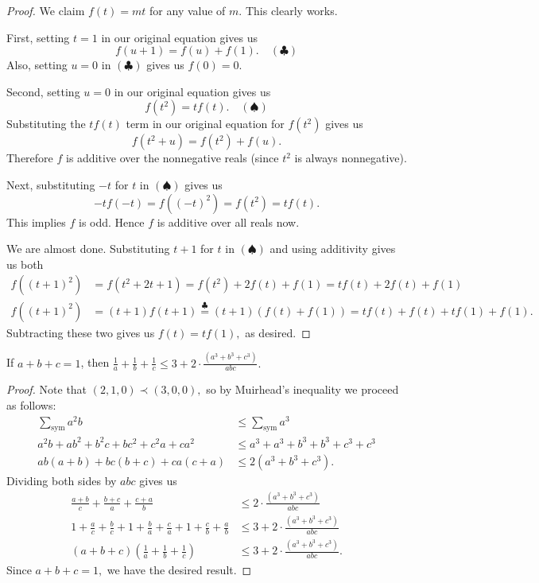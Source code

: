\documentclass[letterpaper,oneside]{scrartcl}
\begin{document}
\begin{proof}
  We claim \(f(t)=mt\) for any value of \(m\). This clearly works. 

  First, setting \(t=1\) in our original equation gives us 
  \[f(u+1) = f(u) + f(1). \quad (\clubsuit)\]
  Also, setting \(u=0\) in \((\clubsuit)\) gives us \(f(0)=0.\)

  Second, setting \(u=0\) in our original equation gives us 
  \[f(t^2) = tf(t). \quad (\spadesuit)\]
  Substituting the \(tf(t)\) term in our original equation for \(f(t^2)\) gives us 
  \[f(t^2+u) = f(t^2) + f(u).\]
  Therefore \(f\) is additive over the nonnegative reals (since \(t^2\) is always nonnegative). 
  
  Next, substituting \(-t\) for \(t\) in \((\spadesuit)\) gives us 
  \[-tf(-t) = f((-t)^2) = f(t^2) = tf(t).\]
  This implies \(f\) is odd. Hence \(f\) is additive over all reals now.

  We are almost done. Substituting \(t+1\) for \(t\) in \((\spadesuit)\) and using additivity gives us both 
  \begin{align*}
    f((t+1)^2) &= f(t^2+2t+1) = f(t^2) + 2f(t) + f(1) = tf(t) + 2f(t) + f(1)\\
    f((t+1)^2) &= (t+1)f(t+1) \overset{\clubsuit}{=} (t+1)(f(t)+f(1)) = tf(t) + f(t) + tf(1) + f(1).
  \end{align*}
  Subtracting these two gives us \(f(t) = tf(1),\) as desired.
\end{proof}
\newpage
\begin{problem*}
  If \(a+b+c=1\), then \(\frac1a + \frac1b + \frac1c \leq 3 + 2\cdot\frac{\left(a^3+b^3+c^3\right)}{abc}.\)
\end{problem*}
\begin{proof}
  Note that \((2,1,0) \prec (3,0,0),\) so by Muirhead's inequality we proceed as follows:
  \begin{align*}
    \sum_{\text{sym}} a^2b &\leq \sum_{\text{sym}} a^3 \\
    a^2b+ab^2 + b^2c+bc^2 + c^2a+ca^2 &\leq a^3+a^3+b^3+b^3+c^3+c^3 \\
    ab(a+b) + bc(b+c) + ca(c+a) &\leq 2\left(a^3+b^3+c^3\right).
  \end{align*}
  Dividing both sides by \(abc\) gives us
  \begin{align*}
    \frac{a+b}{c} + \frac{b+c}{a} + \frac{c+a}{b} &\leq 2\cdot\frac{\left(a^3+b^3+c^3\right)}{abc} \\
    1 + \frac{a}{c} + \frac{b}{c} + 1 + \frac{b}{a} + \frac{c}{a} + 1 + \frac{c}{b} + \frac{a}{b} &\leq 3 + 2\cdot\frac{\left(a^3+b^3+c^3\right)}{abc} \\
    (a+b+c)\left(\frac1a + \frac1b + \frac1c\right) &\leq 3 + 2\cdot\frac{\left(a^3+b^3+c^3\right)}{abc}.
  \end{align*}
  Since \(a+b+c=1,\) we have the desired result.
\end{proof}
\end{document}
